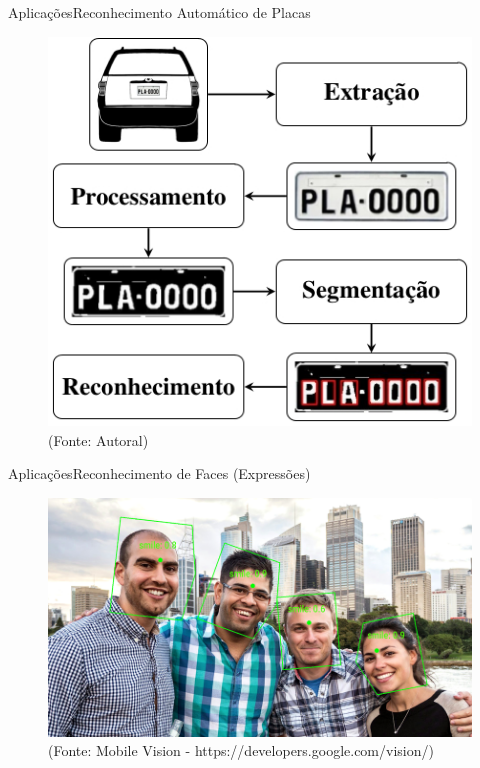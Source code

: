 \begin{frame}{Aplicações}{Reconhecimento Automático de Placas}

\begin{figure}
    \centering
    \includegraphics[scale=.4]{img/lpr.jpeg}
    \\ (Fonte: Autoral)
    \label{fig:lpr_recognition}
\end{figure}

\end{frame}

\begin{frame}{Aplicações}{Reconhecimento de Faces (Expressões)}

\begin{figure}
    \centering
    \includegraphics[scale=.3]{img/face_recognition.png}
    \\ (Fonte: Mobile Vision - https://developers.google.com/vision/)
    \label{fig:face_recognition}
\end{figure}

\end{frame}

